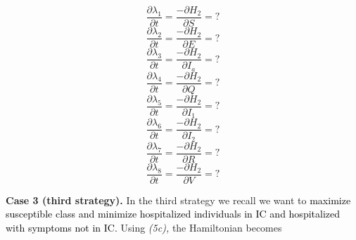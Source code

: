 \documentclass[a4paper]{article}
\begin{document}
\begin{equation*}
\frac{{\partial}\lambda _1}{{\partial}t}=\frac{-{\partial}H_2}{{\partial}S}=?
\end{equation*}
\begin{equation*}
\frac{{\partial}\lambda _2}{{\partial}t}=\frac{-{\partial}H_2}{{\partial}E}=?
\end{equation*}
\begin{equation*}
\frac{{\partial}\lambda _3}{{\partial}t}=\frac{-{\partial}H_2}{{\partial}I_a}=?
\end{equation*}
\begin{equation*}
\frac{{\partial}\lambda _4}{{\partial}t}=\frac{-{\partial}H_2}{{\partial}Q}=?
\end{equation*}
\begin{equation*}
\frac{{\partial}\lambda _5}{{\partial}t}=\frac{-{\partial}H_2}{{\partial}I_1}=?
\end{equation*}
\begin{equation*}
\frac{{\partial}\lambda _6}{{\partial}t}=\frac{-{\partial}H_2}{{\partial}I_2}=?
\end{equation*}
\begin{equation*}
\frac{{\partial}\lambda _7}{{\partial}t}=\frac{-{\partial}H_2}{{\partial}R}=?
\end{equation*}
\begin{equation*}
\frac{{\partial}\lambda _8}{{\partial}t}=\frac{-{\partial}H_2}{{\partial}V}=?
\end{equation*}

\bigskip


\bigskip

\textbf{Case 3 (third strategy). }In the third strategy we recall we want to \textcolor{black}{maximize susceptible
class and minimize hospitalized individuals in IC and hospitalized with symptoms not in IC.}\textbf{ }Using
\textit{(5c), }the Hamiltonian becomes
\end{document}
